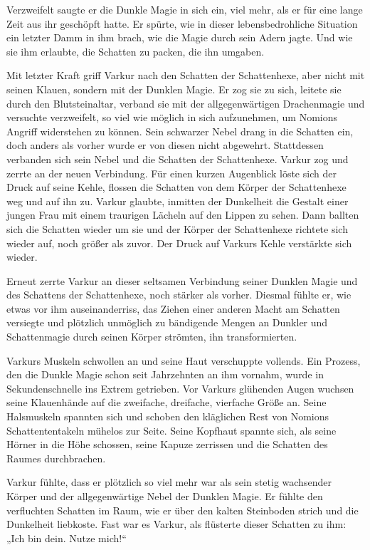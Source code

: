 Verzweifelt saugte er die Dunkle Magie in sich ein, viel mehr, als er für eine lange Zeit aus ihr geschöpft hatte. Er spürte, wie in dieser lebensbedrohliche Situation ein letzter Damm in ihm brach, wie die Magie durch sein Adern jagte. Und wie sie ihm erlaubte, die Schatten zu packen, die ihn umgaben.

Mit letzter Kraft griff Varkur nach den Schatten der Schattenhexe, aber nicht mit seinen Klauen, sondern mit der Dunklen Magie. Er zog sie zu sich, leitete sie durch den Blutsteinaltar, verband sie mit der allgegenwärtigen Drachenmagie und versuchte verzweifelt, so viel wie möglich in sich aufzunehmen, um Nomions Angriff widerstehen zu können. Sein schwarzer Nebel drang in die Schatten ein, doch anders als vorher wurde er von diesen nicht abgewehrt. Stattdessen verbanden sich sein Nebel und die Schatten der Schattenhexe. Varkur zog und zerrte an der neuen Verbindung. Für einen kurzen Augenblick löste sich der Druck auf seine Kehle, flossen die Schatten von dem Körper der Schattenhexe weg und auf ihn zu. Varkur glaubte, inmitten der Dunkelheit die Gestalt einer jungen Frau mit einem traurigen Lächeln auf den Lippen zu sehen. Dann ballten sich die Schatten wieder um sie und der Körper der Schattenhexe richtete sich wieder auf, noch größer als zuvor. Der Druck auf Varkurs Kehle verstärkte sich wieder.

Erneut zerrte Varkur an dieser seltsamen Verbindung seiner Dunklen Magie und des Schattens der Schattenhexe, noch stärker als vorher. Diesmal fühlte er, wie etwas vor ihm auseinanderriss, das Ziehen einer anderen Macht am Schatten versiegte und plötzlich unmöglich zu bändigende Mengen an Dunkler und Schattenmagie durch seinen Körper strömten, ihn transformierten.

Varkurs Muskeln schwollen an und seine Haut verschuppte vollends. Ein Prozess, den die Dunkle Magie schon seit Jahrzehnten an ihm vornahm, wurde in Sekundenschnelle ins Extrem getrieben. Vor Varkurs glühenden Augen wuchsen seine Klauenhände auf die zweifache, dreifache, vierfache Größe an. Seine Halsmuskeln spannten sich und schoben den kläglichen Rest von Nomions Schattententakeln mühelos zur Seite. Seine Kopfhaut spannte sich, als seine Hörner in die Höhe schossen, seine Kapuze zerrissen und die Schatten des Raumes durchbrachen.

Varkur fühlte, dass er plötzlich so viel mehr war als sein stetig wachsender Körper und der allgegenwärtige Nebel der Dunklen Magie. Er fühlte den verfluchten Schatten im Raum, wie er über den kalten Steinboden strich und die Dunkelheit liebkoste. Fast war es Varkur, als flüsterte dieser Schatten zu ihm: „Ich bin dein. Nutze mich!“

